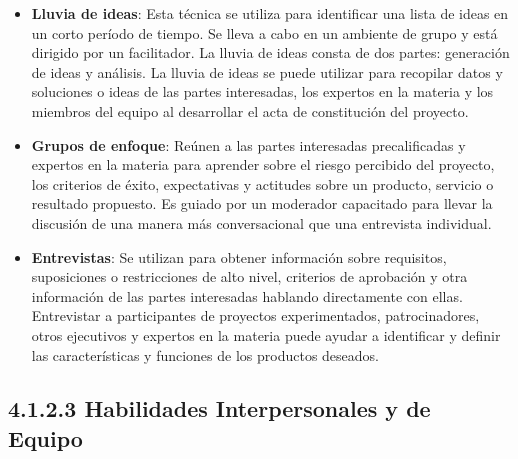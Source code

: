 \documentclass[letterpaper,12pt,openright,oneside]{article}
\theoremstyle{plain}
\begin{document}
\begin{itemize}
    \item \textbf{Lluvia de ideas}: Esta técnica se utiliza para identificar una lista de ideas en un corto período de tiempo. Se lleva a cabo en un ambiente de grupo y está dirigido por un facilitador. La lluvia de ideas consta de dos partes: generación de ideas y análisis. La lluvia de ideas se puede utilizar para recopilar datos y soluciones o ideas de las partes interesadas, los expertos en la materia y los miembros del equipo al desarrollar el acta de constitución del proyecto.
    \item \textbf{Grupos de enfoque}: Reúnen a las partes interesadas precalificadas y expertos en la materia para aprender sobre el riesgo percibido del proyecto, los criterios de éxito, expectativas y actitudes sobre un producto, servicio o resultado propuesto. Es guiado por un moderador capacitado para llevar la discusión de una manera más conversacional que una entrevista individual.
    \item \textbf{Entrevistas}: Se utilizan para obtener información sobre requisitos, suposiciones o restricciones de alto nivel, criterios de aprobación y otra información de las partes interesadas hablando directamente con ellas. Entrevistar a participantes de proyectos experimentados, patrocinadores, otros ejecutivos y expertos en la materia puede ayudar a identificar y definir las características y funciones de los productos deseados.
\end{itemize}
% 
% 
\subsection*{4.1.2.3 Habilidades Interpersonales y de Equipo}
\end{document}

